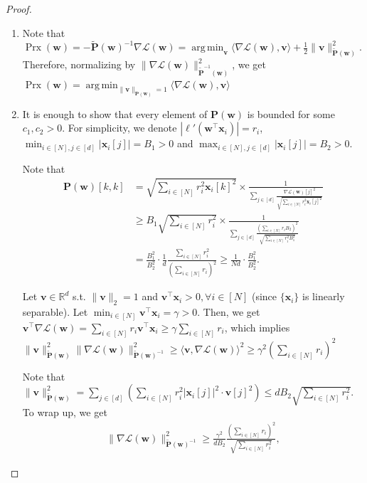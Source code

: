 \documentclass{article} %
\theoremstyle{plain}
\theoremstyle{definition}
\theoremstyle{remark}
\def\bigabs#1{\left|#1\right|}
\newcommand{\Ls}{\mathcal{L}}
\DeclareMathOperator*{\argmin}{arg\,min}
\def\bx{{\mathbf x}}
\def\bP{{\mathbf P}}
\def\bw{{\mathbf w}}
\def\bv{{\mathbf v}}
\DeclareMathOperator{\proxy}{Prx}
\begin{document}
\begin{proof}
\begin{enumerate}[label=(\alph*)]
    \item Note that $\proxy(\bw) = - \tilde{\bP}(\bw)^{-1} \nabla \Ls(\bw) = \argmin_\bv \langle \nabla \Ls(\bw), \bv \rangle + \frac{1}{2}\|\bv\|_{\tilde{\bP}(\bw)}^2$. Therefore, normalizing by $\|\nabla \Ls(\bw)\|_{\tilde{\bP}^{-1}(\bw)}^2$, we get $\displaystyle \proxy(\bw)= \argmin_{\|\bv\|_{\bP(\bw)}=1}\langle \nabla \Ls(\bw), \bv \rangle$

    \item It is enough to show that every element of $\bP(\bw)$ is bounded for some $c_1, c_2>0$. For simplicity, we denote $|\ell'(\bw^\top\bx_i)|=r_i$, $\min_{i \in [N], j\in[d]} \bigabs{\bx_i[j]} = B_1>0$ and $\max_{i \in [N], j\in[d]} \bigabs{\bx_i[j]} = B_2>0$.

    Note that
    \begin{align*}
        \bP(\bw)[k, k] &= \sqrt{\sum_{i \in [N]}r_i^2\bx_i[k]^2} \times \frac{1}{\sum_{j \in [d]} \frac{\nabla \Ls(\bw)[j]^2}{\sqrt{\sum_{i \in [N]}r_i^2 \bx_i[j]^2}}} \\
        &\geq B_1 \sqrt{\sum_{i \in [N]} r_i^2} \times \frac{1}{\sum_{j\in[d]} \frac{(\sum_{i\in[N]} r_i B_2)^2}{\sqrt{\sum_{i\in[N]} r_i^2 B_1^2}}} \\
        &= \frac{B_1^2}{B_2^2} \cdot \frac{1}{d} \frac{\sum_{i\in[N]} r_i^2}{(\sum_{i\in[N]} r_i)^2} \geq \frac{1}{Nd} \cdot \frac{B_1^2}{B_2^2}.
    \end{align*}

Let $\bv \in \mathbb{R}^d$ s.t. $\|\bv\|_2=1$ and $\bv^\top \bx_i > 0, \forall i \in [N]$ (since $\{\bx_i\}$ is linearly separable). Let $\min_{i \in [N]} \bv^\top \bx_i = \gamma > 0$. Then, we get $\bv^\top \nabla \Ls(\bw) = \sum_{i \in [N]} r_i \bv^\top \bx_i \geq \gamma \sum_{i \in [N]} r_i
$, which implies $\|\bv\|_{\tilde{\bP}(\bw)}^2 \|\nabla \Ls(\bw)\|_{\tilde{\bP}(\bw)^{-1}}^2 \geq \langle \bv, \nabla \Ls(\bw) \rangle^2 \geq \gamma^2 \left(\sum_{i \in [N]} r_i\right)^2$

Note that $\|\bv\|_{\tilde{\bP}(\bw)}^2 = \sum_{j \in [d]} \left(\sum_{i \in [N]} r_i^2 |\bx_i[j]|^2 \cdot \bv[j]^2 \right) \leq dB_2 \sqrt{\sum_{i \in [N]} r_i^2}$. To wrap up, we get
\begin{align*}
    \|\nabla \Ls(\bw)\|_{\tilde{\bP}(\bw)^{-1}}^2 \geq \frac{\gamma^2}{dB_2} \frac{(\sum_{i \in [N]} r_i)^2}{\sqrt{\sum_{i \in [N]} r_i^2}},
\end{align*}


\end{enumerate}
\end{proof}
\end{document}
